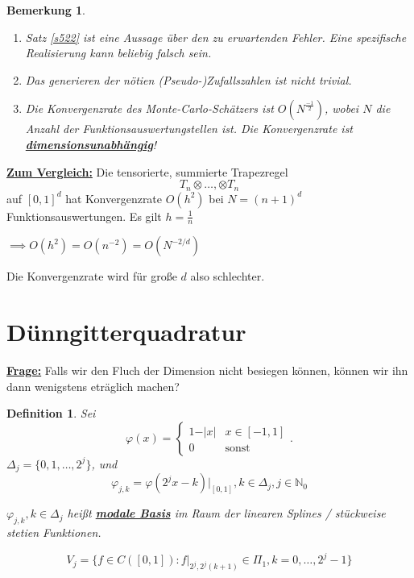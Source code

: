 \documentclass{book}
\newtheorem{definition}[algorithm]{Definition}
\newtheorem{remark}[algorithm]{Bemerkung}
\def\N{\mathbb{N}}
\begin{document}
            \begin{remark}\label{b523}
                \begin{enumerate}
                    \item Satz \ref{s522} ist eine Aussage über den zu erwartenden Fehler. Eine spezifische Realisierung kann beliebig falsch sein.
                    \item Das generieren der nötien (Pseudo-)Zufallszahlen ist nicht trivial.
                    \item Die Konvergenzrate des Monte-Carlo-Schätzers ist $O(N^{\frac{-1}{2}})$, wobei $N$ die Anzahl der Funktionsauswertungstellen ist. 
                          Die Konvergenzrate ist \underline{\textbf{dimensionsunabhängig}}!
                \end{enumerate}
            \end{remark}

            \underline{\textbf{Zum Vergleich:}} Die tensorierte, summierte Trapezregel 
            \[T_n\otimes\dots,\otimes T_n\] 
            auf $[0,1]^d$ hat Konvergenzrate $O(h^2)$ bei $N=(n+1)^d$ Funktionsauswertungen. Es gilt $h=\frac{1}{n}$

            $\implies O(h^2)=O(n^{-2})=O(N^{-2/d})$

            Die Konvergenzrate wird für große $d$ also schlechter.


        \section{Dünngitterquadratur}

            \underline{\textbf{Frage:}} Falls wir den Fluch der Dimension nicht besiegen können, können wir ihn dann wenigstens eträglich machen?
            
            \begin{definition}\label{d524}
                Sei 
                \[\varphi(x)=\begin{cases}1-\vert x\vert & x\in[-1,1]\\ 0 & \text{sonst}\end{cases}.\]
                    $\Delta_j=\{0,1,\dots,2^j\}$, und 
                \[\varphi_{j,k}=\varphi(2^j x-k)\vert_{[0,1]},k\in\Delta_j,j\in \N_0\]

                $\varphi_{j,k},k\in\Delta_j$ heißt \underline{\textbf{modale Basis}} im Raum der linearen Splines / stückweise stetien Funktionen. 

                \[V_j=\{f\in C([0,1]):f\vert_{2^j,2^j(k+1)}\in \Pi_1,k=0,\dots,2^j-1\}\]

            \end{definition}
\end{document}
